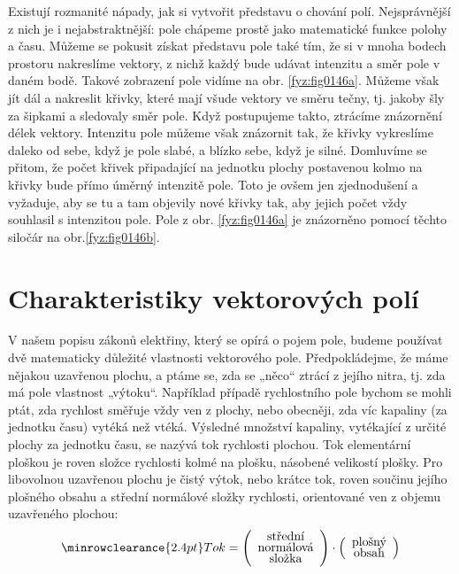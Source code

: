      Existují rozmanité nápady, jak si vytvořit představu o chování polí. Nejsprávnější z nich je i
      nejabstraktnější: pole chápeme prostě jako matematické funkce polohy a času. Můžeme se 
      pokusit získat představu pole také tím, že si v mnoha bodech prostoru nakreslíme vektory, z 
      nichž každý bude udávat intenzitu a směr pole v daném bodě. Takové zobrazení pole vidíme na 
      obr. \ref{fyz:fig0146a}. Můžeme však jít dál a nakreslit křivky, které mají všude vektory 
      ve směru tečny, tj. jakoby šly za šipkami a sledovaly směr pole. Když postupujeme takto, 
      ztrácíme znázornění délek vektory. Intenzitu pole můžeme však znázornit tak, že křivky 
      vykreslíme daleko od sebe, když je pole slabé, a blízko sebe, když je silné. Domluvíme se 
      přitom, že počet křivek připadající na jednotku plochy postavenou kolmo na křivky 
      bude přímo úměrný intenzitě pole. Toto je ovšem jen zjednodušení a vyžaduje, aby se tu a tam 
      objevily nové křivky tak, aby jejich počet vždy souhlasil s intenzitou pole. Pole z obr. 
      \ref{fyz:fig0146a} je znázorněno pomocí těchto siločár na obr.\ref{fyz:fig0146b}.

        
  \section{Charakteristiky vektorových polí}
    V našem popisu zákonů elektřiny, který se opírá o pojem pole, budeme používat dvě matematicky 
    důležité vlastnosti vektorového pole. Předpokládejme, že máme nějakou uzavřenou plochu, a ptáme 
    se, zda se „něco“ ztrácí z jejího nitra, tj. zda má pole vlastnost „výtoku“. Například případě 
    rychlostního pole bychom se mohli ptát, zda rychlost směřuje vždy ven z plochy, nebo obecněji, 
    zda víc kapaliny (za jednotku času) vytéká než vtéká. Výsledné množství kapaliny, vytékající z 
    určité plochy za jednotku času, se nazývá tok rychlosti plochou. Tok elementární ploškou je 
    roven složce rychlosti kolmé na plošku, násobené velikostí plošky. Pro libovolnou uzavřenou 
    plochu je čistý výtok, nebo krátce tok, roven součinu jejího plošného obsahu a střední 
    normálové složky rychlosti, orientované ven z objemu uzavřeného plochou:    
    \begin{equation}\label{fyz:eq_fey_elmag04}
      \renewcommand\arraystretch{0.6} \setlength\minrowclearance{2.4pt}
      \text{Tok} = 
        \left(\begin{array}{c}
          \text{střední}      \\
          \text{normálová} \\
          \text{složka}
        \end{array}
      \right)\cdot
      \left(\begin{array}{c}
          \text{plošný}      \\
          \text{obsah}
        \end{array}
      \right)
    \end{equation}
    
